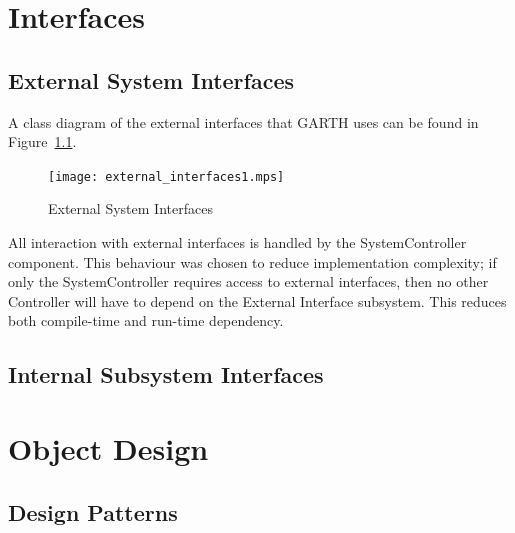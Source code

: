 \documentclass{report}
\begin{document}
\chapter{Interfaces} %
\label{ch:interfaces}

\section{External System Interfaces}

A class diagram of the external interfaces that GARTH uses can be found in
Figure~\ref{fig:external_interfaces}.

\begin{figure}[hp]
    \centering
        \caption{External System Interfaces}
        \scriptsize
        \setlength{\unitlength}{2.0em}
        \texttt{[image: external\_interfaces1.mps]}
        \normalsize
    \label{fig:external_interfaces}
\end{figure}

All interaction with external interfaces is handled by the SystemController
component. This behaviour was chosen to reduce implementation complexity; if
only the SystemController requires access to external interfaces, then
no other Controller will have to depend on the External Interface subsystem.
This reduces both compile-time and run-time dependency.

\section{Internal Subsystem Interfaces}



\chapter{Object Design} %
\label{ch:object-design}


\section{Design Patterns}

\end{document}
